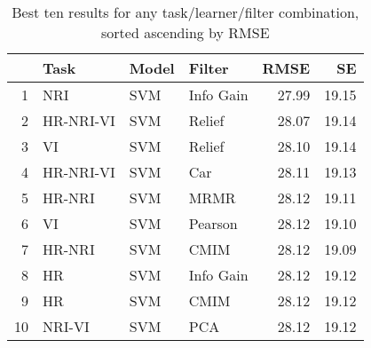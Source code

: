\begin{table}[ht!]
\centering
\caption{Best ten results for any task/learner/filter combination, sorted ascending by RMSE} 
\label{tab:perf-top-10}
\begin{tabular}{rlllrr}
  \hline
 & Task & Model & Filter & RMSE & SE \\ 
  \hline
1 & NRI & SVM & Info Gain & 27.99 & 19.15 \\ 
  2 & HR-NRI-VI & SVM & Relief & 28.07 & 19.14 \\ 
  3 & VI & SVM & Relief & 28.10 & 19.14 \\ 
  4 & HR-NRI-VI & SVM & Car & 28.11 & 19.13 \\ 
  5 & HR-NRI & SVM & MRMR & 28.12 & 19.11 \\ 
  6 & VI & SVM & Pearson & 28.12 & 19.10 \\ 
  7 & HR-NRI & SVM & CMIM & 28.12 & 19.09 \\ 
  8 & HR & SVM & Info Gain & 28.12 & 19.12 \\ 
  9 & HR & SVM & CMIM & 28.12 & 19.12 \\ 
  10 & NRI-VI & SVM & PCA & 28.12 & 19.12 \\ 
   \hline
\end{tabular}
\end{table}
